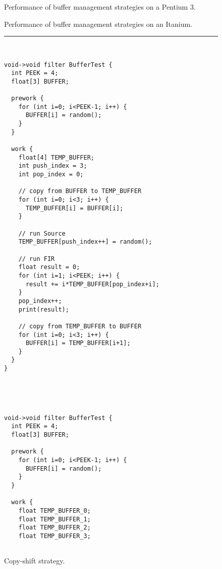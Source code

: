 \begin{figure*}
\begin{minipage}{3.4in}

\caption{Performance of buffer management strategies on a Pentium 3.\protect\label{fig:buf-p3}}
\end{minipage}
\hspace{0.1in}
\begin{minipage}{3.4in}

\caption{Performance of buffer management strategies on an Itanium.\protect\label{fig:buf-itanium}}
\end{minipage}
\vspace{18pt}
\hrule
\begin{minipage}[t]{2.1in}
{\scriptsize
\begin{verbatim}


void->void filter BufferTest {
  int PEEK = 4;
  float[3] BUFFER;

  prework {
    for (int i=0; i<PEEK-1; i++) {
      BUFFER[i] = random();
    }
  }

  work {
    float[4] TEMP_BUFFER;
    int push_index = 3;
    int pop_index = 0;

    // copy from BUFFER to TEMP_BUFFER
    for (int i=0; i<3; i++) {
      TEMP_BUFFER[i] = BUFFER[i];
    }

    // run Source
    TEMP_BUFFER[push_index++] = random();
    
    // run FIR
    float result = 0;
    for (int i=1; i<PEEK; i++) {
      result += i*TEMP_BUFFER[pop_index+i];
    }
    pop_index++;
    print(result);

    // copy from TEMP_BUFFER to BUFFER
    for (int i=0; i<3; i++) {
      BUFFER[i] = TEMP_BUFFER[i+1];
    }
  }
}
\end{verbatim}}

\caption{Copy-shift strategy.\protect\label{fig:copy-shift}}
\end{minipage}
~~\vrule~~
\begin{minipage}[t]{2in}
{\scriptsize
\begin{verbatim}


void->void filter BufferTest {
  int PEEK = 4;
  float[3] BUFFER;

  prework {
    for (int i=0; i<PEEK-1; i++) {
      BUFFER[i] = random();
    }
  }

  work {
    float TEMP_BUFFER_0;
    float TEMP_BUFFER_1;
    float TEMP_BUFFER_2;
    float TEMP_BUFFER_3;


\end{verbatim}}
\end{minipage}
\end{figure*}
